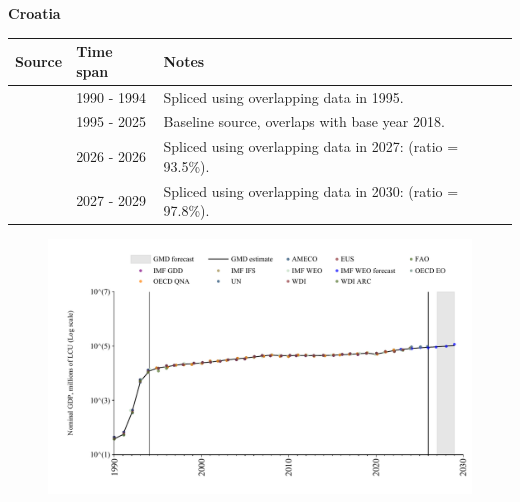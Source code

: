 \documentclass[12pt,a4paper,landscape]{article}
\begin{document}
\begin{adjustbox}{max totalsize={\paperwidth}{\paperheight},center}
\begin{minipage}[t][\textheight][t]{\textwidth}
\vspace*{0.5cm}
{}
\begin{center}
{\Large\bfseries Croatia}
\end{center}
\vspace{0.5cm}
\begin{table}[H]
\centering
\small
\begin{tabular}{|l|l|l|}
\hline
\textbf{Source} & \textbf{Time span} & \textbf{Notes} \\
\hline
\rowcolor{white}\cite{AMECO}& 1990 - 1994 &Spliced using overlapping data in 1995.\\
\rowcolor{lightgray}\cite{OECD_EO}& 1995 - 2025 &Baseline source, overlaps with base year 2018.\\
\rowcolor{white}\cite{AMECO}& 2026 - 2026 &Spliced using overlapping data in 2027: (ratio = 93.5\%).\\
\rowcolor{lightgray}\cite{IMF_WEO_forecast}& 2027 - 2029 &Spliced using overlapping data in 2030: (ratio = 97.8\%).\\
\hline
\end{tabular}
\end{table}
\begin{figure}[H]
\centering
\includegraphics[width=\textwidth,height=0.6\textheight,keepaspectratio]{graphs/HRV_nGDP.pdf}
\end{figure}
\end{minipage}
\end{adjustbox}
\end{document}
